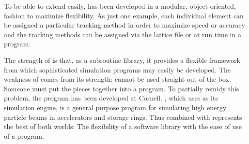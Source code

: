 To be able to extend \bmad easily, \bmad has been developed in a
modular, object oriented, fashion to maximize flexibility. As just one
example, each individual element can be assigned a particular tracking
method in order to maximize speed or accuracy and the tracking methods
can be assigned via the lattice file or at run time in a program.

The strength of \bmad is that, as a subroutine library, it provides a
flexible framework from which sophisticated simulation programs may
easily be developed.  The weakness of \bmad comes from its strength:
\bmad cannot be used straight out of the box. Someone must put the
pieces together into a program. To partially remidy this problem, the
\tao program\cite{b:tao} has been developed at Cornell. \tao, which uses
\bmad as its simulation engine, is a general purpose program for
simulating high energy particle beams in accelerators and storage rings.
Thus \bmad combined with \tao represents the best of both worlds: The
flexibility of a software library with the ease of use of a program.

\vfill
\break
